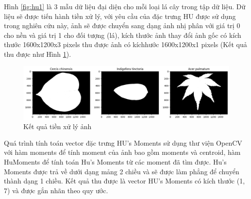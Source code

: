 \documentclass[a4paper]{article}
\begin{document}
Hình \ref{fig:hu1} là 3 mẫu dữ liệu đại diện cho mỗi loại lá cây trong tập dữ liệu. Dữ
liệu sẽ được tiến hành tiền xử lý, với yêu cầu của đặc trưng HU được sử dụng
trong nghiên cứu này, ảnh sẽ được chuyển sang dạng ảnh nhị phân với giá trị 0 cho nền và giá trị 1 cho đối tượng (lá), kích thước ảnh thay đổi ảnh gốc có kích thước 1600x1200x3 pixels thu được ảnh có kíchhước 1600x1200x1 pixels (Kết quả thu được như Hình \ref{fig:hu2}).

\begin{figure}
    \centering
    \includegraphics[width=1\linewidth]{image.png}
    \caption{Kết quả tiền xử lý ảnh}
    \label{fig:hu2}
\end{figure}

Quá trình tính toán vector đặc trưng HU's Moments sử dụng thư viện OpenCV với hàm moments để  tính moment của ảnh bao gồm moments và centroid, hàm HuMoments để tính toán Hu's Moments từ các moment đã tìm được. Hu's Moments được trả về dưới dạng mảng 2 chiều và sẽ được làm phẳng để chuyển thành dạng 1 chiều. Kết quả thu được là vector HU's Moments có kích thước (1, 7) và được gắn nhãn theo quy ước.
\newpage
\end{document}
